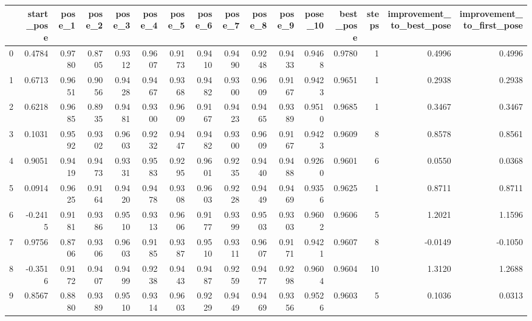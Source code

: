 \begin{tabular}{lrrrrrrrrrrrrrrr}
\toprule
{} &  start\_pose &  pose\_1 &  pose\_2 &  pose\_3 &  pose\_4 &  pose\_5 &  pose\_6 &  pose\_7 &  pose\_8 &  pose\_9 &  pose\_10 &  best\_pose &  steps &  improvement\_to\_best\_pose &  improvement\_to\_first\_pose \\
\midrule
0  &      0.4784 &  0.9780 &  0.8705 &  0.9312 &  0.9607 &  0.9173 &  0.9410 &  0.9490 &  0.9248 &  0.9433 &   0.9468 &     0.9780 &      1 &                    0.4996 &                     0.4996 \\
1  &      0.6713 &  0.9651 &  0.9056 &  0.9428 &  0.9467 &  0.9368 &  0.9482 &  0.9300 &  0.9609 &  0.9167 &   0.9423 &     0.9651 &      1 &                    0.2938 &                     0.2938 \\
2  &      0.6218 &  0.9685 &  0.8935 &  0.9481 &  0.9300 &  0.9609 &  0.9167 &  0.9423 &  0.9465 &  0.9389 &   0.9510 &     0.9685 &      1 &                    0.3467 &                     0.3467 \\
3  &      0.1031 &  0.9592 &  0.9302 &  0.9603 &  0.9232 &  0.9447 &  0.9482 &  0.9300 &  0.9609 &  0.9167 &   0.9423 &     0.9609 &      8 &                    0.8578 &                     0.8561 \\
4  &      0.9051 &  0.9419 &  0.9473 &  0.9331 &  0.9583 &  0.9295 &  0.9601 &  0.9235 &  0.9440 &  0.9488 &   0.9260 &     0.9601 &      6 &                    0.0550 &                     0.0368 \\
5  &      0.0914 &  0.9625 &  0.9164 &  0.9420 &  0.9478 &  0.9308 &  0.9603 &  0.9228 &  0.9449 &  0.9469 &   0.9356 &     0.9625 &      1 &                    0.8711 &                     0.8711 \\
6  &     -0.2415 &  0.9181 &  0.9386 &  0.9510 &  0.9313 &  0.9606 &  0.9177 &  0.9399 &  0.9503 &  0.9303 &   0.9602 &     0.9606 &      5 &                    1.2021 &                     1.1596 \\
7  &      0.9756 &  0.8706 &  0.9306 &  0.9603 &  0.9185 &  0.9387 &  0.9510 &  0.9311 &  0.9607 &  0.9171 &   0.9421 &     0.9607 &      8 &                   -0.0149 &                    -0.1050 \\
8  &     -0.3516 &  0.9172 &  0.9407 &  0.9499 &  0.9238 &  0.9443 &  0.9487 &  0.9259 &  0.9477 &  0.9298 &   0.9604 &     0.9604 &     10 &                    1.3120 &                     1.2688 \\
9  &      0.8567 &  0.8880 &  0.9389 &  0.9510 &  0.9314 &  0.9603 &  0.9229 &  0.9449 &  0.9469 &  0.9356 &   0.9526 &     0.9603 &      5 &                    0.1036 &                     0.0313 \\

\end{tabular}
